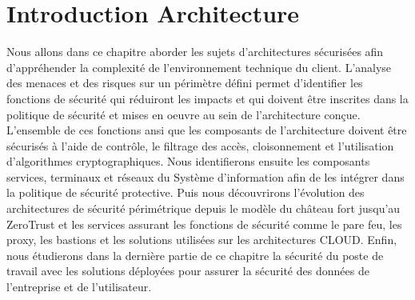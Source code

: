 \section{Introduction Architecture}
Nous allons dans ce chapitre aborder les sujets d'architectures sécurisées afin d'appréhender la complexité de l'environnement technique du client.
L'analyse des menaces et des risques sur un périmètre défini permet d'identifier les fonctions de sécurité qui réduiront les impacts et qui doivent être inscrites dans la politique de sécurité et mises en oeuvre au sein de l'architecture conçue.
L'ensemble de ces fonctions ansi que les composants de l'architecture doivent être sécurisés à l'aide de contrôle, le filtrage des accès, cloisonnement et l'utilisation d'algorithmes cryptographiques.
Nous identifierons ensuite les composants services, terminaux et réseaux du Système d'information afin de les intégrer dans la politique de sécurité protective.
Puis nous découvrirons l'évolution des architectures de sécurité périmétrique depuis le modèle du château fort jusqu'au ZeroTrust et les services assurant les fonctions de sécurité comme le pare feu, les proxy, les bastions et les solutions utilisées sur les architectures CLOUD.
Enfin, nous étudierons dans la dernière partie de ce chapitre la sécurité du poste de travail avec les solutions déployées pour assurer la sécurité des données de l'entreprise et de l'utilisateur.






